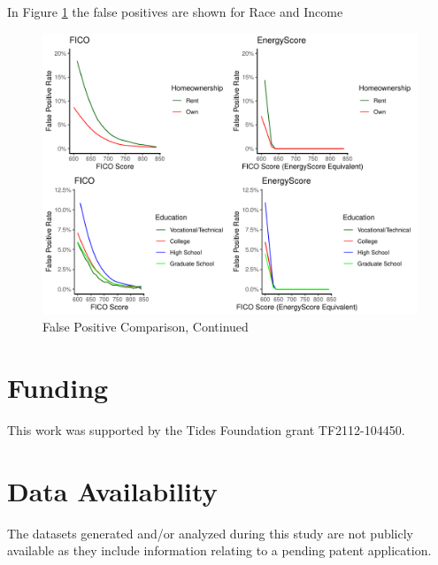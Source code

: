 \documentclass[11pt,]{article}
\begin{document}
In Figure \ref{fig:fprace2} the false positives are shown for Race and
Income

\begin{figure}
\centering
\includegraphics{figs/fprace2.pdf}
\caption{\label{fig:fprace2}False Positive Comparison, Continued}
\end{figure}

\hypertarget{funding}{%
\section{Funding}\label{funding}}

This work was supported by the Tides Foundation grant TF2112-104450.

\hypertarget{data-availability}{%
\section{Data Availability}\label{data-availability}}

The datasets generated and/or analyzed during this study are not
publicly available as they include information relating to a pending
patent application.





\newpage
\singlespacing 

\end{document}

